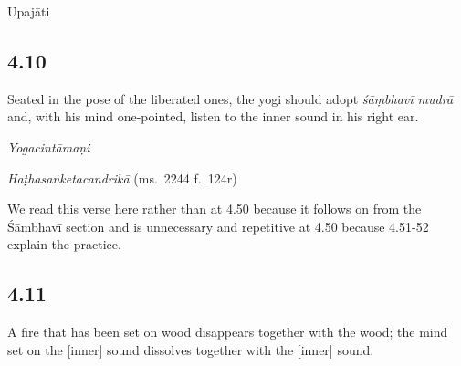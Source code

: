 \begin{ekdosis}

\begin{metre}[hp04_009]
Upajāti
\end{metre}

\subsection*{4.10}
\begin{translation}[hp04_010]
Seated in the pose of the liberated ones, the yogi should adopt \emph{śāṃbhavī mudrā} and, with his mind one-pointed, listen to the inner sound in his right ear.
\end{translation}


\begin{testimonia}[hp04_010]
\emph{Yogacintāmaṇi}
\begin{versinnote}
\end{versinnote}

\emph{Haṭhasaṅketacandrikā} (ms.~2244 f.~124r)
\begin{versinnote}
\tl{\var{dakṣiṇe karṇe ] B220,  dakṣirṇe 2244}\\+}
\tl{\var{ekāṃtike ] 2244, ekāṃtate B220}\\!}
\end{versinnote}
\end{testimonia}

\begin{philcomm}[hp04_010]
We read this verse here rather than at 4.50 because it follows on from the Śāmbhavī section and is unnecessary and repetitive at 4.50 because 4.51-52 explain the practice.
\end{philcomm}

\subsection*{4.11}
\begin{translation}[hp04_011]
A fire that has been set on wood disappears together with the wood; the mind set on the [inner] sound dissolves together with the [inner] sound.
\end{translation}


\end{ekdosis}
